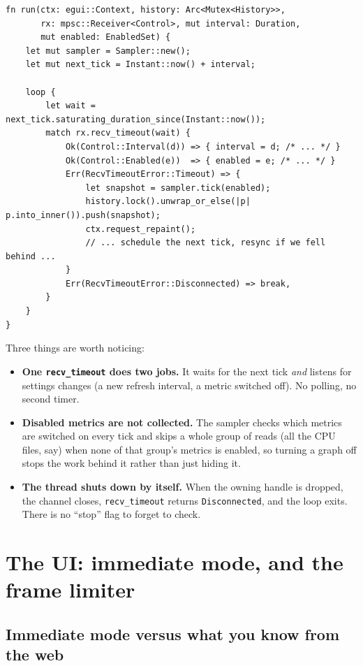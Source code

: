 \documentclass[11pt,a4paper]{article}
\newcommand{\code}[1]{\texttt{#1}}
\newcommand{\file}[1]{\texttt{#1}}
\begin{document}
\begin{lstlisting}[caption={The sampler loop (\file{sampler/mod.rs}, trimmed).}]
fn run(ctx: egui::Context, history: Arc<Mutex<History>>,
       rx: mpsc::Receiver<Control>, mut interval: Duration,
       mut enabled: EnabledSet) {
    let mut sampler = Sampler::new();
    let mut next_tick = Instant::now() + interval;

    loop {
        let wait = next_tick.saturating_duration_since(Instant::now());
        match rx.recv_timeout(wait) {
            Ok(Control::Interval(d)) => { interval = d; /* ... */ }
            Ok(Control::Enabled(e))  => { enabled = e; /* ... */ }
            Err(RecvTimeoutError::Timeout) => {
                let snapshot = sampler.tick(enabled);
                history.lock().unwrap_or_else(|p| p.into_inner()).push(snapshot);
                ctx.request_repaint();
                // ... schedule the next tick, resync if we fell behind ...
            }
            Err(RecvTimeoutError::Disconnected) => break,
        }
    }
}
\end{lstlisting}

Three things are worth noticing:

\begin{itemize}
  \item \textbf{One \code{recv\_timeout} does two jobs.} It waits for the next tick \emph{and}
        listens for settings changes (a new refresh interval, a metric switched off). No
        polling, no second timer.
  \item \textbf{Disabled metrics are not collected.} The sampler checks which metrics are
        switched on every tick and skips a whole group of reads (all the CPU files, say) when
        none of that group's metrics is enabled, so turning a graph off stops the work behind
        it rather than just hiding it.
  \item \textbf{The thread shuts down by itself.} When the owning handle is dropped, the
        channel closes, \code{recv\_timeout} returns \code{Disconnected}, and the loop exits.
        There is no ``stop'' flag to forget to check.
\end{itemize}

\section{The UI: immediate mode, and the frame limiter}

\subsection{Immediate mode versus what you know from the web}
\end{document}
